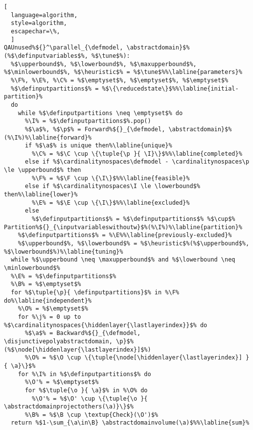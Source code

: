 {\begin{marginalgorithm}[*-18]
  \caption{Parallel Implementation $\parallelqlibra$}
\begin{lstlisting}[
  language=algorithm,
  style=algorithm,
  escapechar=\%,
  ]
QAUnused%${}^\parallel_{\defmodel, \abstractdomain}$%(%$\definputvariables$%, %$\tune$%):
  %$\upperbound$%, %$\lowerbound$%, %$\maxupperbound$%, %$\minlowerbound$%, %$\heuristic$% = %$\tune$%%\labline{parameters}%
  %\F%, %\E%, %\C% = %$\emptyset$%, %$\emptyset$%, %$\emptyset$%
  %$\definputpartitions$% = %$\{\reducedstate\}$%%\labline{initial-partition}%
  do
    while %$\definputpartitions \neq \emptyset$% do
      %\I% = %$\definputpartitions$%.pop()
      %$\a$%, %$\p$% = Forward%${}_{\defmodel, \abstractdomain}$%(%\I%)%\labline{forward}%
      if %$\a$% is unique then%\labline{unique}%
        %\C% = %$\C \cup \{\tuple{\p }{ \I}\}$%%\labline{completed}%
      else if %$\cardinalitynospaces\defmodel - \cardinalitynospaces\p \le \upperbound$% then
        %\F% = %$\F \cup \{\I\}$%%\labline{feasible}%
      else if %$\cardinalitynospaces\I \le \lowerbound$% then%\labline{lower}%
        %\E% = %$\E \cup \{\I\}$%%\labline{excluded}%
      else
        %$\definputpartitions$% = %$\definputpartitions$% %$\cup$% Partition%${}_{\inputvariableswithoutw}$%(%\I%)%\labline{partition}%
    %$\definputpartitions$% = %\E%%\labline{previously-excluded}%
    %$\upperbound$%, %$\lowerbound$% = %$\heuristic$%(%$\upperbound$%, %$\lowerbound$%)%\labline{tuning}%
  while %$\upperbound \neq \maxupperbound$% and %$\lowerbound \neq \minlowerbound$%
  %\E% = %$\definputpartitions$%
  %\B% = %$\emptyset$%
  for %$\tuple{\p}{ \definputpartitions}$% in %\F% do%\labline{independent}%
    %\O% = %$\emptyset$%
    for %\j% = 0 up to %$\cardinalitynospaces{\hiddenlayer{\lastlayerindex}}$% do
      %$\a$% = Backward%${}_{\defmodel, \disjunctivepolyabstractdomain, \p}$%(%$\node[\hiddenlayer{\lastlayerindex}]$%)
      %\O% = %$\O \cup \{\tuple{\node[\hiddenlayer{\lastlayerindex}] }{ \a}\}$%
    for %\I% in %$\definputpartitions$% do
      %\O'% = %$\emptyset$%
      for %$\tuple{\o }{ \a}$% in %\O% do
        %\O'% = %$\O' \cup \{\tuple{\o }{ \abstractdomainprojectothers(\a)}\}$%
      %\B% = %$\B \cup \textup{Check}(\O')$%
  return %$1-\sum_{\a\in\B} \abstractdomainvolume(\a)$%%\labline{sum}%
\end{lstlisting}
\end{marginalgorithm}

}
